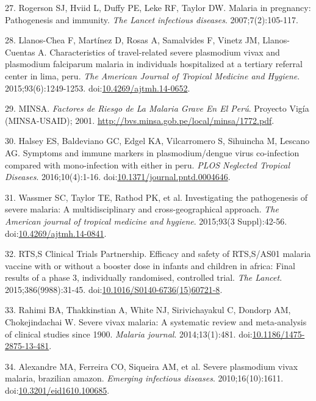 \documentclass[]{article}
\begin{document}
\hypertarget{ref-rogerson2007preg}{}
27. Rogerson SJ, Hviid L, Duffy PE, Leke RF, Taylor DW. Malaria in
pregnancy: Pathogenesis and immunity. \emph{The Lancet infectious
diseases}. 2007;7(2):105-117.

\hypertarget{ref-llanoschea2015}{}
28. Llanos-Chea F, Martínez D, Rosas A, Samalvides F, Vinetz JM,
Llanos-Cuentas A. Characteristics of travel-related severe plasmodium
vivax and plasmodium falciparum malaria in individuals hospitalized at a
tertiary referral center in lima, peru. \emph{The American Journal of
Tropical Medicine and Hygiene}. 2015;93(6):1249-1253.
doi:\href{https://doi.org/10.4269/ajtmh.14-0652}{10.4269/ajtmh.14-0652}.

\hypertarget{ref-factores2001}{}
29. MINSA. \emph{Factores de Riesgo de La Malaria Grave En El Perú}.
Proyecto Vigía (MINSA-USAID); 2001.
\url{http://bvs.minsa.gob.pe/local/minsa/1772.pdf}.

\hypertarget{ref-baldevi2016}{}
30. Halsey ES, Baldeviano GC, Edgel KA, Vilcarromero S, Sihuincha M,
Lescano AG. Symptoms and immune markers in plasmodium/dengue virus
co-infection compared with mono-infection with either in peru.
\emph{PLOS Neglected Tropical Diseases}. 2016;10(4):1-16.
doi:\href{https://doi.org/10.1371/journal.pntd.0004646}{10.1371/journal.pntd.0004646}.

\hypertarget{ref-wassmer2015}{}
31. Wassmer SC, Taylor TE, Rathod PK, et al. Investigating the
pathogenesis of severe malaria: A multidisciplinary and
cross-geographical approach. \emph{The American journal of tropical
medicine and hygiene}. 2015;93(3 Suppl):42-56.
doi:\href{https://doi.org/10.4269/ajtmh.14-0841}{10.4269/ajtmh.14-0841}.

\hypertarget{ref-rts2015}{}
32. RTS,S Clinical Trials Partnership. Efficacy and safety of RTS,S/AS01
malaria vaccine with or without a booster dose in infants and children
in africa: Final results of a phase 3, individually randomised,
controlled trial. \emph{The Lancet}. 2015;386(9988):31-45.
doi:\href{https://doi.org/10.1016/S0140-6736(15)60721-8}{10.1016/S0140-6736(15)60721-8}.

\hypertarget{ref-rahimi2014meta}{}
33. Rahimi BA, Thakkinstian A, White NJ, Sirivichayakul C, Dondorp AM,
Chokejindachai W. Severe vivax malaria: A systematic review and
meta-analysis of clinical studies since 1900. \emph{Malaria journal}.
2014;13(1):481.
doi:\href{https://doi.org/10.1186/1475-2875-13-481}{10.1186/1475-2875-13-481}.

\hypertarget{ref-alexandre2010}{}
34. Alexandre MA, Ferreira CO, Siqueira AM, et al. Severe plasmodium
vivax malaria, brazilian amazon. \emph{Emerging infectious diseases}.
2010;16(10):1611.
doi:\href{https://doi.org/10.3201/eid1610.100685}{10.3201/eid1610.100685}.
\end{document}
